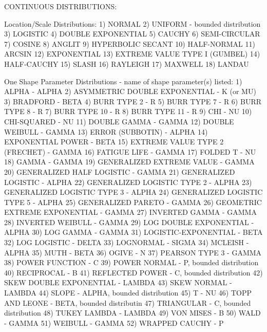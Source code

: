 CONTINUOUS DISTRIBUTIONS:

Location/Scale Distributions:
      1) NORMAL
      2) UNIFORM - bounded distribution
      3) LOGISTIC
      4) DOUBLE EXPONENTIAL
      5) CAUCHY
      6) SEMI-CIRCULAR
      7) COSINE
      8) ANGLIT
      9) HYPERBOLIC SECANT
     10) HALF-NORMAL
     11) ARCSIN
     12) EXPONENTIAL
     13) EXTREME VALUE TYPE I (GUMBEL)
     14) HALF-CAUCHY
     15) SLASH
     16) RAYLEIGH
     17) MAXWELL
     18) LANDAU

One Shape Parameter Distributions - name of shape parameter(s) listed:
      1) ALPHA                          - ALPHA
      2) ASYMMETRIC DOUBLE EXPONENTIAL  - K (or MU)
      3) BRADFORD                       - BETA
      4) BURR TYPE 2                    - R
      5) BURR TYPE 7                    - R
      6) BURR TYPE 8                    - R
      7) BURR TYPE 10                   - R
      8) BURR TYPE 11                   - R
      9) CHI                            - NU
     10) CHI-SQUARED                    - NU
     11) DOUBLE GAMMA                   - GAMMA
     12) DOUBLE WEIBULL                 - GAMMA
     13) ERROR (SUBBOTIN)               - ALPHA
     14) EXPONENTIAL POWER              - BETA
     15) EXTREME VALUE TYPE 2 (FRECHET) - GAMMA
     16) FATIGUE LIFE                   - GAMMA
     17) FOLDED T                       - NU
     18) GAMMA                          - GAMMA
     19) GENERALIZED EXTREME VALUE      - GAMMA
     20) GENERALIZED HALF LOGISTIC      - GAMMA
     21) GENERALIZED LOGISTIC           - ALPHA
     22) GENERALIZED LOGISTIC TYPE 2    - ALPHA
     23) GENERALIZED LOGISTIC TYPE 3    - ALPHA
     24) GENERALIZED LOGISTIC TYPE 5    - ALPHA
     25) GENERALIZED PARETO             - GAMMA
     26) GEOMETRIC EXTREME  EXPONENTIAL - GAMMA
     27) INVERTED GAMMA                 - GAMMA
     28) INVERTED WEIBULL               - GAMMA
     29) LOG DOUBLE EXPONENTIAL         - ALPHA
     30) LOG GAMMA                      - GAMMA
     31) LOGISTIC-EXPONENTIAL           - BETA
     32) LOG LOGISTIC                   - DELTA
     33) LOGNORMAL                      - SIGMA
     34) MCLEISH                        - ALPHA
     35) MUTH                           - BETA
     36) OGIVE                          - N
     37) PEARSON TYPE 3                 - GAMMA
     38) POWER FUNCTION                 - C
     39) POWER NORMAL                   - P, bounded distribution
     40) RECIPROCAL                     - B
     41) REFLECTED POWER                - C, bounded distribution
     42) SKEW DOUBLE EXPONENTIAL        - LAMBDA
     43) SKEW NORMAL                    - LAMBDA
     44) SLOPE                          - ALPHA, bounded distribution
     45) T                              - NU
     46) TOPP AND LEONE                 - BETA, bounded distributin
     47) TRIANGULAR                     - C, bounded distribution
     48) TUKEY LAMBDA                   - LAMBDA
     49) VON MISES                      - B
     50) WALD                           - GAMMA
     51) WEIBULL                        - GAMMA
     52) WRAPPED CAUCHY                 - P
    
